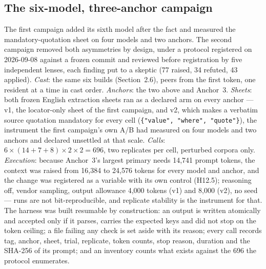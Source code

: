 \documentclass[11pt]{article}
\begin{document}
\subsection{The six-model, three-anchor campaign}\label{sec:s12}
The first campaign added its sixth model after the fact and measured the mandatory-quotation sheet on four models and two anchors. The second campaign removed both asymmetries by design, under a protocol registered on 2026-09-08 against a frozen commit and reviewed before registration by five independent lenses, each finding put to a skeptic (77 raised, 34 refuted, 43 applied). \emph{Cast}: the same six builds (Section~2.6), peers from the first token, one resident at a time in cast order. \emph{Anchors}: the two above and Anchor~3. \emph{Sheets}: both frozen English extraction sheets ran as a declared arm on every anchor --- v1, the locator-only sheet of the first campaign, and v2, which makes a verbatim source quotation mandatory for every cell (\texttt{\{"value", "where", "quote"\}}), the instrument the first campaign's own A/B had measured on four models and two anchors and declared unsettled at that scale. \emph{Calls}: $6 \times (14+7+8) \times 2 \times 2 = 696$, two replicates per cell, perturbed corpora only. \emph{Execution}: because Anchor~3's largest primary needs 14{,}741 prompt tokens, the context was raised from 16{,}384 to 24{,}576 tokens for every model and anchor, and the change was registered as a variable with its own control (H12.5); reasoning off, vendor sampling, output allowance 4{,}000 tokens (v1) and 8{,}000 (v2), no seed --- runs are not bit-reproducible, and replicate stability is the instrument for that. The harness was built resumable by construction: an output is written atomically and accepted only if it parses, carries the expected keys and did not stop on the token ceiling; a file failing any check is set aside with its reason; every call records tag, anchor, sheet, trial, replicate, token counts, stop reason, duration and the SHA-256 of its prompt; and an inventory counts what exists against the 696 the protocol enumerates.
\end{document}
